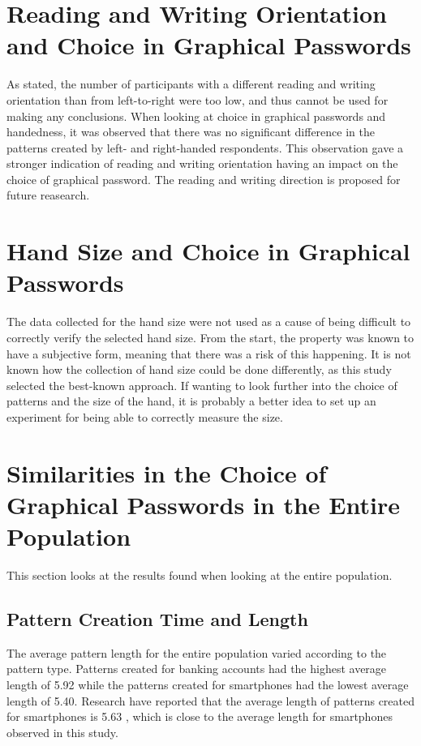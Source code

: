   \section{Reading and Writing Orientation and Choice in Graphical Passwords}
    As stated, the number of participants with a different reading and writing orientation than from left-to-right were too low, and thus cannot be used for making any conclusions. When looking at choice in graphical passwords and handedness, it was observed that there was no significant difference in the patterns created by left- and right-handed respondents. This observation gave a stronger indication of reading and writing orientation having an impact on the choice of graphical password. The reading and writing direction is proposed for future reasearch. 

  \section{Hand Size and Choice in Graphical Passwords}
    The data collected for the hand size were not used as a cause of being difficult to correctly verify the selected hand size. From the start, the property was known to have a subjective form, meaning that there was a risk of this happening. It is not known how the collection of hand size could be done differently, as this study selected the best-known approach. If wanting to look further into the choice of patterns and the size of the hand, it is probably a better idea to set up an experiment for being able to correctly measure the size. 

  \section{Similarities in the Choice of Graphical Passwords in the Entire Population}\label{sec:discussionEntirePopulation}

    This section looks at the results found when looking at the entire population. 

    \subsection{Pattern Creation Time and Length}
      The average pattern length for the entire population varied according to the pattern type. Patterns created for banking accounts had the highest average length of 5.92 while the patterns created for smartphones had the lowest average length of 5.40. Research have reported that the average length of patterns created for smartphones is 5.63 \cite{Uellenbeck}, which is close to the average length for smartphones observed in this study. 

